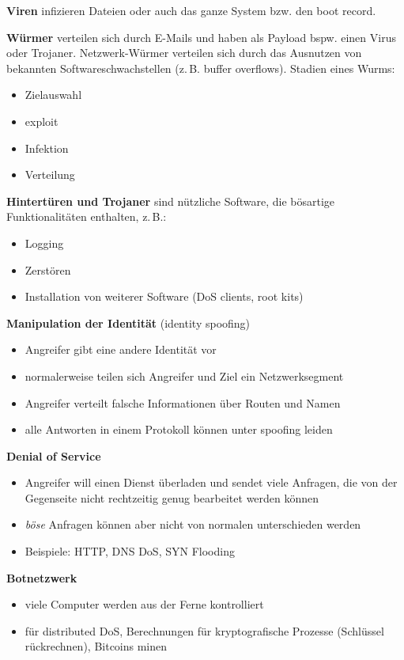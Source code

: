 \textbf{Viren} infizieren Dateien oder auch das ganze System bzw. den boot record.

\textbf{Würmer} verteilen sich durch E-Mails und haben als Payload bspw. einen Virus oder
Trojaner.
Netzwerk-Würmer verteilen sich durch das Ausnutzen von bekannten Softwareschwachstellen
(z.\,B. buffer overflows).
Stadien eines Wurms:
\begin{itemize}
  \item Zielauswahl
  \item exploit
  \item Infektion
  \item Verteilung
\end{itemize}
\textbf{Hintertüren und Trojaner} sind nützliche Software, die bösartige Funktionalitäten
enthalten, z.\,B.:
\begin{itemize}
  \item Logging
  \item Zerstören
  \item Installation von weiterer Software (DoS clients, root kits)
\end{itemize}
\textbf{Manipulation der Identität} (identity spoofing)
\begin{itemize}
  \item Angreifer gibt eine andere Identität vor
  \item normalerweise teilen sich Angreifer und Ziel ein Netzwerksegment
  \item Angreifer verteilt falsche Informationen über Routen und Namen
  \item alle Antworten in einem Protokoll können unter spoofing leiden
\end{itemize}
\textbf{Denial of Service}
\begin{itemize}
  \item Angreifer will einen Dienst überladen und sendet viele Anfragen, die von der
    Gegenseite nicht rechtzeitig genug bearbeitet werden können
  \item \emph{böse} Anfragen können aber nicht von normalen unterschieden werden
  \item Beispiele: HTTP, DNS DoS, SYN Flooding
\end{itemize}
\textbf{Botnetzwerk}
\begin{itemize}
  \item viele Computer werden aus der Ferne kontrolliert
  \item für distributed DoS, Berechnungen für kryptografische Prozesse
    (Schlüssel rückrechnen), Bitcoins minen
\end{itemize}
